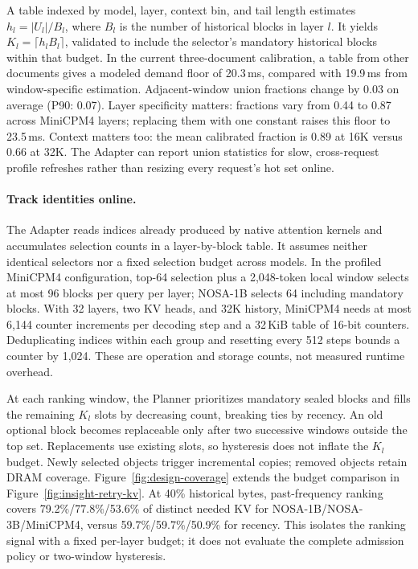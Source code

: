A table indexed by model, layer, context bin, and tail length estimates
$h_l=|U_l|/B_l$, where $B_l$ is the number of historical blocks in layer
$l$. It yields $K_l=\lceil h_l B_l\rceil$, validated to include the
selector's mandatory historical blocks within that budget.
In the current three-document calibration, a table from other documents
gives a modeled demand floor of 20.3\,ms, compared with 19.9\,ms from
window-specific estimation. Adjacent-window union fractions change by
0.03 on average (P90: 0.07). Layer specificity matters: fractions vary
from 0.44 to 0.87 across MiniCPM4 layers; replacing them with one constant
raises this floor to 23.5\,ms. Context matters too: the mean calibrated
fraction is 0.89 at 16K versus 0.66 at 32K. The Adapter can report union
statistics for slow, cross-request profile refreshes rather than
resizing every request's hot set online.

\paragraph{Track identities online.}
The Adapter reads indices already produced by native attention kernels
and accumulates selection counts in a layer-by-block table. It assumes
neither identical selectors nor a fixed selection budget across models.
In the profiled MiniCPM4 configuration, top-64 selection plus a
2,048-token local window selects at most 96 blocks per query per layer;
NOSA-1B selects 64 including mandatory blocks. With 32 layers, two KV
heads, and 32K history, MiniCPM4 needs at most 6,144 counter increments
per decoding step and a 32\,KiB table of 16-bit counters. Deduplicating
indices within each group and resetting every 512 steps bounds a
counter by 1,024. These are operation and storage counts, not measured
runtime overhead.

At each ranking window, the Planner prioritizes mandatory sealed blocks
and fills the remaining $K_l$ slots by decreasing count, breaking ties
by recency. An old optional block becomes replaceable only after two
successive windows outside the top set. Replacements use existing slots,
so hysteresis does not inflate the $K_l$ budget. Newly selected objects
trigger incremental copies; removed objects retain DRAM coverage.
Figure~\ref{fig:design-coverage} extends the budget comparison in
Figure~\ref{fig:insight-retry-kv}. At 40\% historical bytes, past-frequency
ranking covers 79.2\%/77.8\%/53.6\% of distinct needed KV for
NOSA-1B/NOSA-3B/MiniCPM4, versus 59.7\%/59.7\%/50.9\% for recency.
This isolates the ranking signal with a fixed per-layer budget; it does
not evaluate the complete admission policy or two-window hysteresis.

